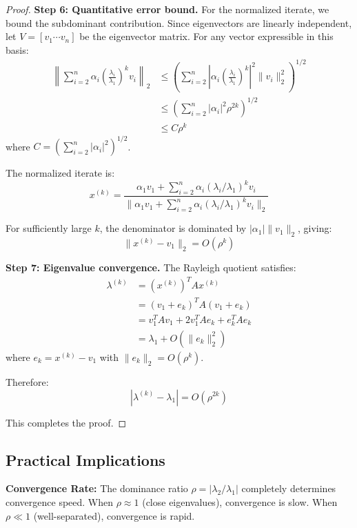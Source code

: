 \documentclass[11pt,twocolumn]{article}
\begin{document}
\begin{proof}
\textbf{Step 6: Quantitative error bound.}
For the normalized iterate, we bound the subdominant contribution. Since eigenvectors are linearly independent, let $V = [v_1 \cdots v_n]$ be the eigenvector matrix. For any vector expressible in this basis:
\begin{align}
\left\|\sum_{i=2}^n \alpha_i \left(\frac{\lambda_i}{\lambda_1}\right)^k v_i\right\|_2 &\leq \left(\sum_{i=2}^n \left|\alpha_i \left(\frac{\lambda_i}{\lambda_1}\right)^k\right|^2 \|v_i\|_2^2\right)^{1/2} \nonumber \\
&\leq \left(\sum_{i=2}^n |\alpha_i|^2 \rho^{2k}\right)^{1/2} \nonumber \\
&\leq C \rho^k
\end{align}
where $C = \left(\sum_{i=2}^n |\alpha_i|^2\right)^{1/2}$.

The normalized iterate is:
\begin{equation}
x^{(k)} = \frac{\alpha_1 v_1 + \sum_{i=2}^n \alpha_i (\lambda_i/\lambda_1)^k v_i}{\|\alpha_1 v_1 + \sum_{i=2}^n \alpha_i (\lambda_i/\lambda_1)^k v_i\|_2}
\end{equation}

For sufficiently large $k$, the denominator is dominated by $|\alpha_1| \|v_1\|_2$, giving:
\begin{equation}
\|x^{(k)} - v_1\|_2 = O(\rho^k)
\end{equation}

\textbf{Step 7: Eigenvalue convergence.}
The Rayleigh quotient satisfies:
\begin{align}
\lambda^{(k)} &= (x^{(k)})^T A x^{(k)} \nonumber \\
&= (v_1 + e_k)^T A (v_1 + e_k) \nonumber \\
&= v_1^T A v_1 + 2v_1^T A e_k + e_k^T A e_k \nonumber \\
&= \lambda_1 + O(\|e_k\|_2^2)
\end{align}
where $e_k = x^{(k)} - v_1$ with $\|e_k\|_2 = O(\rho^k)$.

Therefore:
\begin{equation}
|\lambda^{(k)} - \lambda_1| = O(\rho^{2k})
\end{equation}

This completes the proof.
\end{proof}

\subsection{Practical Implications}

\textbf{Convergence Rate:} The dominance ratio $\rho = |\lambda_2/\lambda_1|$ completely determines convergence speed. When $\rho \approx 1$ (close eigenvalues), convergence is slow. When $\rho \ll 1$ (well-separated), convergence is rapid.
\end{document}
